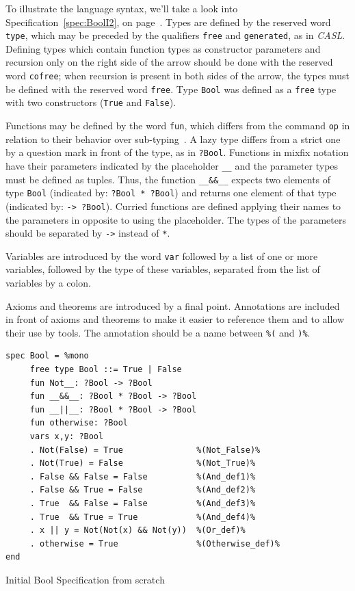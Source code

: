 \documentclass[12pt,twoside]{article}
\numberwithin{spec}{subsection}
\numberwithin{proof}{subsection}
\numberwithin{figure}{subsection}
\numberwithin{code}{subsection}
\newcommand{\citeSpec}[1]{Specification~\ref{#1}, on page~\pageref{#1}}
\begin{document}
To illustrate the language syntax, we'll take a look into \citeSpec{spec:BoolI2}. Types are defined by the reserved word \verb.type., which may be preceded by the qualifiers \verb.free. and \verb.generated., as in \textit{CASL}. Defining types which contain function types as constructor parameters and recursion only on the right side of the arrow should be done with the reserved word \verb.cofree.; when recursion is present in both sides of the arrow, the types must be defined with the reserved word \verb.free.. Type \verb.Bool. was defined as a \verb.free. type with two constructors (\verb.True. and \verb.False.).

Functions may be defined by the word \verb.fun., which differs from the command \verb.op. in relation to their behavior over sub-typing~\citep{HasCASLOverview}. A lazy type differs from a strict one by a question mark in front of the type, as in \verb.?Bool.. Functions in mixfix notation have their parameters indicated by the placeholder \verb.__. and the parameter types  must be defined as tuples. Thus, the function \verb.__&&__. expects two elements of type \verb.Bool. (indicated by: \verb.?Bool * ?Bool.) and returns one element of that type (indicated by: \verb.-> ?Bool.). Curried functions are defined applying their names to the parameters in opposite to using the placeholder. The types of the parameters should be separated by \verb.->. instead of \verb.*..

Variables are introduced by the word \verb.var. followed by a list of one or more variables, followed by the type of these variables, separated from the list of variables by a colon.

Axioms and theorems are introduced by a final point. Annotations are included in front of axioms and theorems to make it easier to reference them and to allow their use by tools. The annotation should be a name between \verb.%(. and \verb.)%..

\begin{spec}[H]
\begin{verbatim}
spec Bool = %mono
     free type Bool ::= True | False 
     fun Not__: ?Bool -> ?Bool
     fun __&&__: ?Bool * ?Bool -> ?Bool
     fun __||__: ?Bool * ?Bool -> ?Bool
     fun otherwise: ?Bool      
     vars x,y: ?Bool
     . Not(False) = True               %(Not_False)%
     . Not(True) = False               %(Not_True)%
     . False && False = False          %(And_def1)%
     . False && True = False           %(And_def2)%
     . True  && False = False          %(And_def3)%
     . True  && True = True            %(And_def4)%
     . x || y = Not(Not(x) && Not(y))  %(Or_def)%
     . otherwise = True                %(Otherwise_def)%
end
\end{verbatim}
\caption{Initial Bool Specification from scratch}
\label{spec:BoolI2}
\end{spec}
\end{document}
